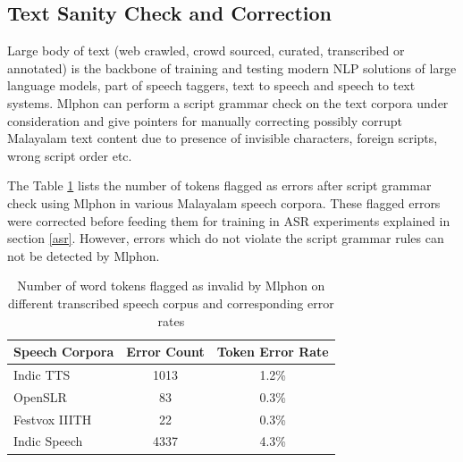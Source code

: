 \documentclass{ieeeaccess}
\begin{document}
\subsection{Text Sanity Check and Correction}

Large body of text (web crawled, crowd sourced, curated, transcribed or annotated) is the backbone of training and testing modern NLP solutions of  large language models,  part of speech taggers, text to speech and speech to text systems. Mlphon can perform a script grammar check on the text corpora under consideration and give pointers for manually correcting possibly corrupt Malayalam text content due to presence of invisible characters, foreign scripts, wrong script order etc.


The Table \ref{sanitycheck} lists the number of tokens flagged as errors after script grammar check using Mlphon in various Malayalam speech corpora. These flagged errors were corrected before feeding them for training in ASR experiments explained in section \ref{asr}. However, errors which do not violate the script grammar rules can not be detected by Mlphon.

\begin{table}[!h]
\caption{Number of word tokens flagged as invalid by Mlphon on different transcribed speech corpus and corresponding error rates}
\label{sanitycheck}
\begin{tabular}{lcc}
\hline \hline
Speech Corpora & Error Count & Token Error Rate \\
\hline
Indic TTS \cite{baby2016resources}& 1013 & 1.2\% \\
OpenSLR \cite{he-etal-2020-open}& 83 & 0.3\%\\
Festvox IIITH \cite{prahallad2012iiit}& 22 & 0.3\% \\
Indic Speech \cite{srivastava-etal-2020-indicspeech}& 4337 & 4.3\%\\
\hline
\end{tabular}
\end{table}
\vspace{0.2cm}



\end{document}
